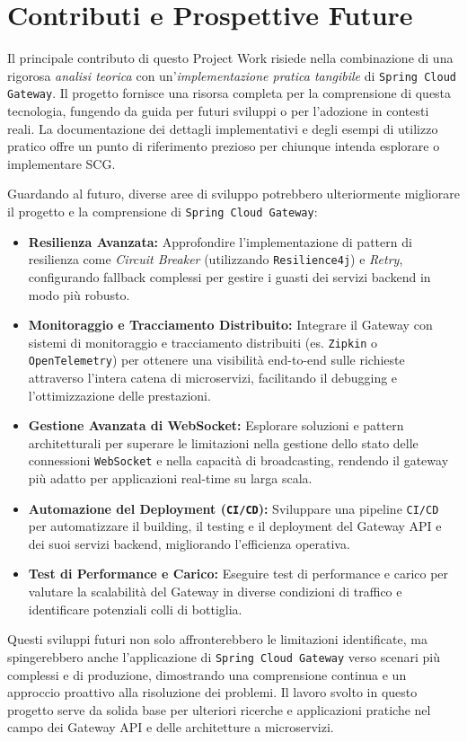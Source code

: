 \section{Contributi e Prospettive Future}

Il principale contributo di questo Project Work risiede nella combinazione di una rigorosa \emph{analisi teorica} con un'\emph{implementazione pratica tangibile} di \texttt{Spring Cloud Gateway}. Il progetto fornisce una risorsa completa per la comprensione di questa tecnologia, fungendo da guida per futuri sviluppi o per l'adozione in contesti reali. La documentazione dei dettagli implementativi e degli esempi di utilizzo pratico offre un punto di riferimento prezioso per chiunque intenda esplorare o implementare \textsc{SCG}.

Guardando al futuro, diverse aree di sviluppo potrebbero ulteriormente migliorare il progetto e la comprensione di \texttt{Spring Cloud Gateway}:

\begin{itemize}
    \item \textbf{Resilienza Avanzata:} Approfondire l'implementazione di pattern di resilienza come \emph{Circuit Breaker} (utilizzando \texttt{Resilience4j}) e \emph{Retry}, configurando fallback complessi per gestire i guasti dei servizi backend in modo più robusto.
    \item \textbf{Monitoraggio e Tracciamento Distribuito:} Integrare il Gateway con sistemi di monitoraggio e tracciamento distribuiti (es. \texttt{Zipkin} o \texttt{OpenTelemetry}) per ottenere una visibilità end-to-end sulle richieste attraverso l'intera catena di microservizi, facilitando il debugging e l'ottimizzazione delle prestazioni.
    \item \textbf{Gestione Avanzata di WebSocket:} Esplorare soluzioni e pattern architetturali per superare le limitazioni nella gestione dello stato delle connessioni \texttt{WebSocket} e nella capacità di broadcasting, rendendo il gateway più adatto per applicazioni real-time su larga scala.
    \item \textbf{Automazione del Deployment (\texttt{CI/CD}):} Sviluppare una pipeline \texttt{CI/CD} per automatizzare il building, il testing e il deployment del Gateway API e dei suoi servizi backend, migliorando l'efficienza operativa.
    \item \textbf{Test di Performance e Carico:} Eseguire test di performance e carico per valutare la scalabilità del Gateway in diverse condizioni di traffico e identificare potenziali colli di bottiglia.
\end{itemize}

Questi sviluppi futuri non solo affronterebbero le limitazioni identificate, ma spingerebbero anche l'applicazione di \texttt{Spring Cloud Gateway} verso scenari più complessi e di produzione, dimostrando una comprensione continua e un approccio proattivo alla risoluzione dei problemi. Il lavoro svolto in questo progetto serve da solida base per ulteriori ricerche e applicazioni pratiche nel campo dei Gateway API e delle architetture a microservizi.